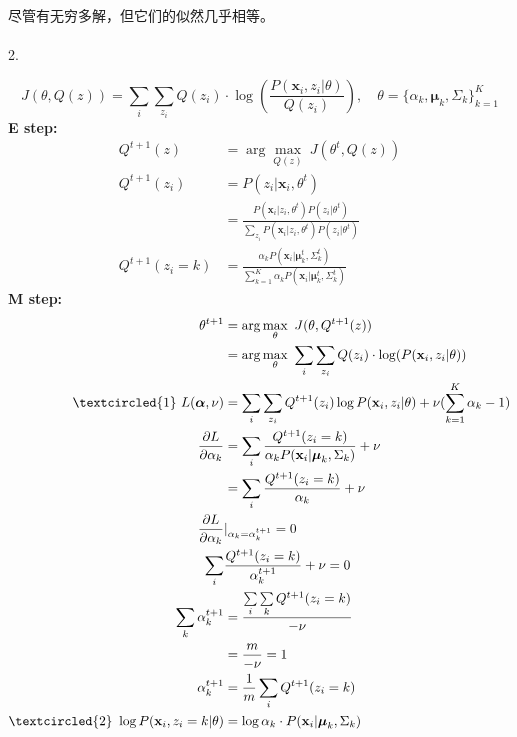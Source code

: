 \documentclass[fleqn,answers]{exam}
\begin{document}
\begin{questions}
尽管有无穷多解，但它们的似然几乎相等。\\
~\\
2.
\begin{solution}
    $$J(\theta,Q(z))=\sum\limits_i \sum\limits_{z_i} Q(z_i)\cdot\log(\frac{P(\mathbf{x}_i,z_i \vert \theta)}{Q(z_i)}), \quad \theta=\{ \alpha_k,\boldsymbol{\mu}_k,\Sigma_k \}_{k=1}^K$$
\textbf{E step:}
\begin{align*}
    Q^{t+1}(z)&=\arg\max\limits_{Q(z)} ~ J(\theta^t,Q(z))\\
    Q^{t+1}(z_i)&=P(z_i \vert \mathbf{x}_i,\theta^t)\\
        &=\frac{P(\mathbf{x}_i \vert z_i,\theta^t)P(z_i \vert \theta^t)}
            {\sum\limits_{z_i} P(\mathbf{x}_i \vert z_i,\theta^t)P(z_i \vert \theta^t)}\\
    Q^{t+1}(z_i=k)&=\frac{\alpha_k P(\mathbf{x}_i \vert \boldsymbol{\mu}_k^t,\Sigma_k^t)}
    {\sum\limits_{k=1}^K \alpha_k P(\mathbf{x}_i \vert \boldsymbol{\mu}_k^t,\Sigma_k^t)}
\end{align*}
\textbf{M step:}
\begin{align*}
    \theta^{t+1}&=\arg\max\limits_\theta ~ J(\theta,Q^{t+1}(z))\\
        &=\arg\max\limits_\theta ~ \sum\limits_i \sum\limits_{z_i} Q(z_i) \cdot \log(P(\mathbf{x}_i,z_i \vert \theta))\\
    \textcircled{1}~
    L(\boldsymbol{\alpha},\nu)&=
        \sum\limits_i \sum\limits_{z_i} Q^{t+1}(z_i) \log P(\mathbf{x}_i,z_i \vert \theta) +
        \nu(\sum\limits_{k=1}^K \alpha_k -1)\\
    \frac{\partial L}{\partial \alpha_k}&=\sum\limits_i \frac{Q^{t+1}(z_i=k)}
        {\alpha_k P(\mathbf{x}_i \vert \boldsymbol{\mu}_k,\Sigma_k)} + \nu\\
        &=\sum\limits_i \frac{Q^{t+1}(z_i=k)}{\alpha_k} + \nu\\
        \frac{\partial L}{\partial \alpha_k}&\vert_{\alpha_k=\alpha_k^{t+1}}=0\\
        \sum\limits_i & \frac{Q^{t+1}(z_i=k)}{\alpha_k^{t+1}} + \nu=0\\
        \sum\limits_k \alpha_k^{t+1} &= \frac{\sum\limits_i \sum\limits_k Q^{t+1}(z_i=k)}{-\nu}\\
        &=\frac{m}{-\nu}=1\\
        \alpha_k^{t+1}&=\frac{1}{m}\sum\limits_i Q^{t+1}(z_i=k)\\
    \textcircled{2}~
    \log P(\mathbf{x}_i,z_i=k \vert \theta)&=\log \alpha_k\cdot P(\mathbf{x}_i\vert \boldsymbol{\mu}_k,\Sigma_k)\\

\end{align*}
\end{solution}
\end{questions}
\end{document}
